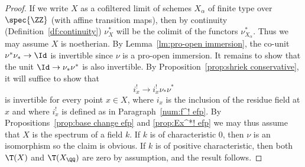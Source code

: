 \begin{proof}
If we write $X$ as a cofiltered limit of schemes $X_\alpha$ of finite type over $\spec{\ZZ}$ (with affine transition maps), then by continuity (Definition~\ref{df:continuity}) $\nu_X^*$ will be the colimit of the functors $\nu_{X_\alpha}^*$.
Thus we may assume $X$ is noetherian.
By Lemma~\ref{lm:pro-open immersion}, the co-unit $\nu^*\nu_* \to \Id$ is invertible since $\nu$ is a pro-open immersion.
It remains to show that the unit $\Id \to \nu_*\nu^*$ is also invertible.
By Proposition~\ref{prop:shriek conservative}, it will suffice to show that
\[
i_x^! \to i_x^!\nu_*\nu^*
\]
is invertible for every point $x \in X$, where $i_x$ is the inclusion of the residue field at $x$ and where $i_x^!$ is defined as in Paragraph~\ref{num:f^! efp}.
By Propositions~\ref{prop:base change efp} and \ref{prop:Ex^*! efp} we may thus assume that $X$ is the spectrum of a field $k$.
If $k$ is of characteristic $0$, then $\nu$ is an isomorphism so the claim is obvious.
If $k$ is of positive characteristic, then both $\T(X)$ and $\T(X_\QQ)$ are zero by assumption, and the result follows.
\end{proof}

